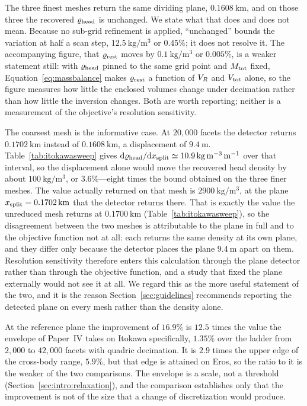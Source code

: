 The three finest meshes return the same dividing plane,
$\SI{0.1608}{\kilo\metre}$, and on those three the recovered $\varrho_{\mathrm{head}}$
is unchanged. We state what that does and does not mean. Because no
sub-grid refinement is applied, ``unchanged'' bounds the variation at
half a scan step, $\SI{12.5}{\kilo\gram\per\cubic\metre}$ or $0.45\%$;
it does not resolve it. The accompanying figure, that $\varrho_{\mathrm{rest}}$ moves
by $\SI{0.1}{\kilo\gram\per\cubic\metre}$ or $0.005\%$, is a weaker
statement still: with $\varrho_{\mathrm{head}}$ pinned to the same grid point and
$M_{\mathrm{tot}}$ fixed, Equation~\eqref{eq:massbalance} makes $\varrho_{\mathrm{rest}}$ a
function of $V_{R}$ and $V_{\mathrm{tot}}$ alone, so the figure measures how little
the enclosed volumes change under decimation rather than how little the
inversion changes. Both are worth reporting; neither is a measurement of
the objective's resolution sensitivity.

The coarsest mesh is the informative case. At $20{,}000$ facets the
detector returns $\SI{0.1702}{\kilo\metre}$ instead of
$\SI{0.1608}{\kilo\metre}$, a displacement of $\SI{9.4}{\metre}$.
Table~\ref{tab:itokawasweep} gives
$\mathrm{d}\varrho_{\mathrm{head}}/\mathrm{d}x_{\mathrm{split}} \simeq
\SI{10.9}{\kilo\gram\per\cubic\metre\per\metre}$ over that interval, so
the displacement alone would move the recovered head density by about
$\SI{100}{\kilo\gram\per\cubic\metre}$, or $3.6\%$---eight times the
bound obtained on the three finer meshes. The value actually returned on
that mesh is $\SI{2900}{\kilo\gram\per\cubic\metre}$, at the plane
$x_{\mathrm{split}} = \SI{0.1702}{\kilo\metre}$ that the detector returns there. That is
exactly the value the unreduced mesh returns at
$\SI{0.1700}{\kilo\metre}$ (Table~\ref{tab:itokawasweep}), so the
disagreement between the two meshes is attributable to the plane in full and
to the objective function not at all: each returns the same density at its
own plane, and they differ only because the detector places the plane
$\SI{9.4}{\metre}$ apart on them.
Resolution sensitivity therefore enters this calculation through the
plane detector rather than through the objective function, and a study
that fixed the plane externally would not see it at all. We regard this
as the more useful statement of the two, and it is the reason
Section~\ref{sec:guidelines} recommends reporting the detected plane on
every mesh rather than the density alone.

At the reference plane the improvement of $16.9\%$ is $12.5$ times the
value the envelope of Paper~IV takes on Itokawa specifically, $1.35\%$ over
the ladder from $2{,}000$ to $42{,}000$ facets with quadric decimation. It is
$2.9$ times the upper edge of the cross-body range, $5.9\%$, but that edge is
attained on Eros, so the ratio to it is the weaker of the two comparisons.
The envelope is a scale, not a threshold
(Section~\ref{sec:intro:relaxation}), and the comparison establishes only
that the improvement is not of the size that a change of discretization
would produce.

